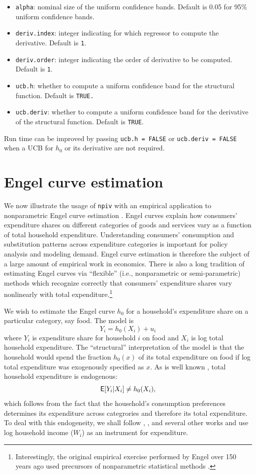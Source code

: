 \documentclass[
]{jss}
\begin{document}
\begin{itemize}
\item
  \texttt{alpha}: nominal size of the uniform confidence bands. Default
  is 0.05 for 95\% uniform confidence bands.
\item
  \texttt{deriv.index}: integer indicating for which regressor to
  compute the derivative. Default is \texttt{1}.
\item
  \texttt{deriv.order}: integer indicating the order of derivative to be
  computed. Default is \texttt{1}.
\item
  \texttt{ucb.h}: whether to compute a uniform confidence band for the
  structural function. Default is \texttt{TRUE.}
\item
  \texttt{ucb.deriv}: whether to compute a uniform confidence band for
  the derivative of the structural function. Default is \texttt{TRUE}.
\end{itemize}

Run time can be improved by passing \texttt{ucb.h\ =\ FALSE} or
\texttt{ucb.deriv\ =\ FALSE} when a UCB for \(h_0\) or its derivative
are not required.

\hypertarget{engel}{%
\section{Engel curve estimation}\label{engel}}

We now illustrate the usage of \texttt{npiv} with an empirical
application to nonparametric Engel curve estimation \citep{BCK}. Engel
curves explain how consumers' expenditure shares on different categories
of goods and services vary as a function of total household expenditure.
Understanding consumers' consumption and substitution patterns across
expenditure categories is important for policy analysis and modeling
demand. Engel curve estimation is therefore the subject of a large
amount of empirical work in economics. There is also a long tradition of
estimating Engel curves via ``flexible'' (i.e., nonparametric or
semi-parametric) methods which recognize correctly that consumers'
expenditure shares vary nonlinearly with total expenditure.\footnote{Interestingly,
  the original empirical exercise performed by Engel over 150 years ago
  used precursors of nonparametric statistical methods \citep{CM}.}

We wish to estimate the Engel curve \(h_0\) for a household's
expenditure share on a particular category, say food. The model is \[
 Y_i = h_0(X_i) + u_i
\] where \(Y_i\) is expenditure share for household \(i\) on food and
\(X_i\) is log total household expenditure. The ``structural''
interpretation of the model is that the household would spend the
fraction \(h_0(x)\) of its total expenditure on food if log total
expenditure was exogenously specified as \(x\). As is well known
\citep{BBL, BBC}, total household expenditure is endogenous: \[
 \mathsf{E}[Y_i | X_i] \neq h_0(X_i),
\] which follows from the fact that the household's consumption
preferences determines its expenditure across categrories and therefore
its total expenditure. To deal with this endogeneity, we shall follow
\citet{BBL}, \citet{BCK}, and several other works and use log household
income (\(W_i\)) as an instrument for expenditure.
\end{document}
